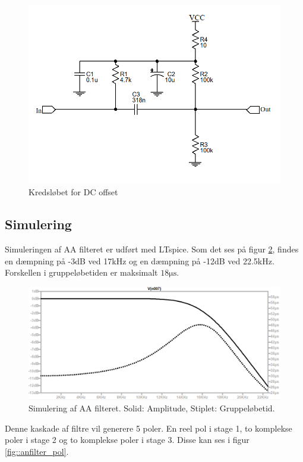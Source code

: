 \begin{figure}[h!]
	\centering
	\includegraphics[scale = 0.4]{./billeder/offset.png}
	\caption{Kredsløbet for DC offset}
	\label{fig::anfilter_off}
\end{figure}







\subsection{Simulering}
Simuleringen af AA filteret er udført med LTspice. Som det ses på figur \ref{fig::anfilter_aasim}, findes en dæmpning på -3dB ved 17kHz og en dæmpning på -12dB ved 22.5kHz. Forskellen i gruppeløbetiden er maksimalt $18 \si{\micro \second}$.
\begin{figure}[h!]
	\centering
	\includegraphics[scale=0.4]{./billeder/aa_sim1}
	\caption{Simulering af AA filteret. Solid: Amplitude, Stiplet: Gruppeløbetid.}
	\label{fig::anfilter_aasim}
\end{figure}
\FloatBlock
Denne kaskade af filtre vil generere 5 poler. En reel pol i stage 1, to komplekse poler i stage 2 og to komplekse poler i stage 3. Disse kan ses i figur \ref{fig::anfilter_pol}.

